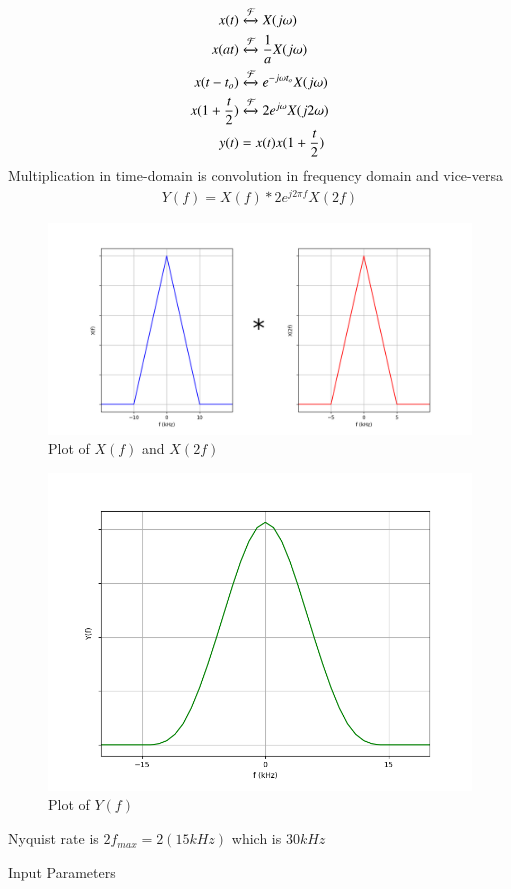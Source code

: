 \documentclass[journal,12pt,twocolumn]{IEEEtran}
\theoremstyle{remark}
\begin{document}
\begin{align}
x(t) &\xleftrightarrow{\mathcal{F}} X(j\omega)\\
x(at) &\xleftrightarrow{\mathcal{F}} \frac{1}{a}X(j\omega)\\
x(t-t_o) &\xleftrightarrow{\mathcal{F}} e^{-j\omega t_o}X(j\omega)\\
x(1+\frac{t}{2}) &\xleftrightarrow{\mathcal{F}} 2e^{j\omega}X(j2\omega)\\
y(t) &= x(t)x(1+\frac{t}{2})
\end{align}
Multiplication in time-domain is convolution in frequency domain and vice-versa
\begin{align}
Y(f) = X(f) * 2e^{j2\pi f}X(2f)
\end{align}
\begin{figure}[h!]
    \centering
    \includegraphics[width=\columnwidth]{figs/plot1.png}
    \caption{Plot of $X(f)$ and $X(2f)$}
    \label{fig:gate2021ec4fig1}
\end{figure}
\begin{figure}[h!]
    \centering
    \includegraphics[width=\columnwidth]{figs/plot2.png}
    \caption{Plot of $Y(f)$}
    \label{fig:gate2021ec4fig2}
\end{figure}
Nyquist rate is $2f_{max} = 2(15kHz)$ which is $30kHz$
\begin{table}[h!]
\centering

\caption{Input Parameters}
\label{tab:gate2021ec4table}
\end{table}
\end{document}
